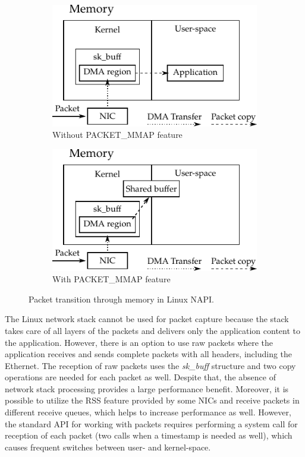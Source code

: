 \begin{figure}[!tb]
    \centering
    \begin{subfigure}[t]{0.5\textwidth}
        \includegraphics{figures/c05/NAPI}
        \caption{Without PACKET\_MMAP feature}
        \label{fig:NAPI_no_MMAP}
    \end{subfigure}%
    \begin{subfigure}[t]{0.5\textwidth}
        \includegraphics{figures/c05/NAPI_MMAP}
        \caption{With PACKET\_MMAP feature}
        \label{fig:NAPI_MMAP}
    \end{subfigure}
    \caption{Packet transition through memory in Linux NAPI.}
    \label{fig:NAPI}
\end{figure}

The Linux network stack cannot be used for packet capture because the stack takes care of all layers of the packets and delivers only the application content to the application. However, there is an option to use raw packets where the application receives and sends complete packets with all headers, including the Ethernet. The reception of raw packets uses the \emph{sk\_buff} structure and two copy operations are needed for each packet as well. Despite that, the absence of network stack processing provides a large performance benefit. Moreover, it is possible to utilize the RSS feature provided by some NICs and receive packets in different receive queues, which helps to increase performance as well. However, the standard API for working with packets requires performing a system call for reception of each packet (two calls when a timestamp is needed as well), which causes frequent switches between user- and kernel-space.

